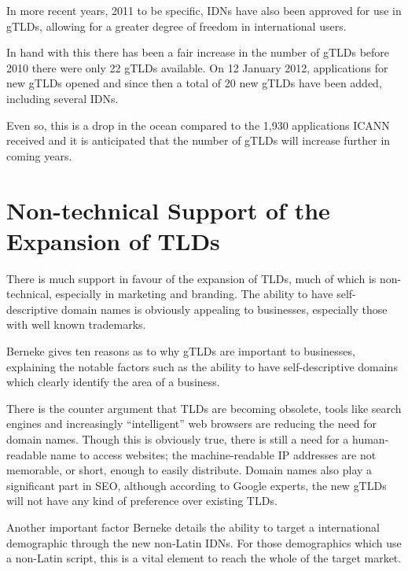 \documentclass[11pt, a4paper]{article}
\begin{document}
In more recent years, 2011 to be specific, \glspl{IDN} have also been approved 
for use in \glspl{gTLD}, allowing for a greater degree of freedom in 
international users.

In hand with this there has been a fair increase in the number of \glspl{gTLD}
before 2010 there were only 22 \glspl{gTLD} available. On 12 January 2012,
applications for new \glspl{gTLD} opened and since then a total of 20 new 
\glspl{gTLD} have been added, including several \glspl{IDN}.

Even so, this is a drop in the ocean compared to the 1,930 applications 
\gls{ICANN} received and it is anticipated that the number of \glspl{gTLD} will
increase further in coming years.


\section{Non-technical Support of the Expansion of TLDs}

There is much support in favour of the expansion of \glspl{TLD}, much of which
is non-technical, especially in marketing and branding. The ability to have 
self-descriptive domain names is obviously appealing to businesses, especially
those with well known trademarks.

Berneke\cite{berneke2013gtlds} gives ten reasons as to why \glspl{gTLD} are important
to businesses, explaining the notable factors such as the ability to have 
self-descriptive domains which clearly identify the area of a business.

There is the counter argument that \glspl{TLD} are becoming 
obsolete\cite{leiba2009good}, tools like search engines and increasingly
``intelligent'' web browsers are reducing the need for domain names. Though
this is obviously true, there is still a need for a human-readable name to 
access websites; the machine-readable IP addresses are not memorable, or short,
enough to easily distribute. Domain names also play a significant part in 
\gls{SEO}, although according to Google experts, the new \glspl{gTLD} will not
have any kind of preference over existing \glspl{TLD}\cite{cutts2012google}.

Another important factor Berneke details the ability to target a international
demographic through the new non-Latin \glspl{IDN}. For those demographics which
use a non-Latin script, this is a vital element to reach the whole of the
target market.
\end{document}
